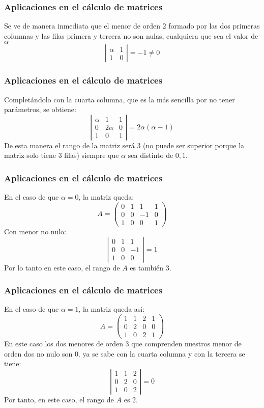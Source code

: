 \documentclass[12pt]{article}
\begin{document}
     \begin{frame}
  \frametitle{Aplicaciones en el c\'alculo de matrices}
Se ve de manera inmediata que el menor de orden 2 formado por las dos primeras columnas y las filas primera y tercera no son nulas, cualquiera que sea el valor de $\alpha$
\[\left|\begin{array}{cc} \alpha & 1 \\ 1&0 \end{array}\right| = -1 \neq 0\]
\end{frame} 


     \begin{frame}
  \frametitle{Aplicaciones en el c\'alculo de matrices}
Complet\'andolo con la cuarta columna, que es la m\'as sencilla por no tener par\'ametros, se obtiene:
\[\left|\begin{array}{ccc} \alpha & 1 &1\\ 0 & 2\alpha &0 \\ 1&0&1 \end{array}\right| = 2\alpha(\alpha-1)\]
De esta manera el rango de la matriz ser\'a 3 (no puede ser superior porque la matriz solo tiene 3 filas) siempre que $\alpha$ sea distinto de $0,1$.
\end{frame} 
  
  
     \begin{frame}
  \frametitle{Aplicaciones en el c\'alculo de matrices}
En el caso de que $\alpha = 0$, la matriz queda:
\[A = \left(\begin{array}{cccc} 0 & 1 & 1 & 1 \\ 0& 0 & -1 & 0 \\ 1&0 & 0 & 1 \end{array}\right)\]
Con menor no nulo:
\[ \left|\begin{array}{ccc} 0 & 1 & 1  \\ 0& 0 & -1  \\ 1&0 & 0  \end{array}\right| = 1\]
Por lo tanto en este caso, el rango de $A$ es tambi\'en 3.
\end{frame} 


     \begin{frame}
  \frametitle{Aplicaciones en el c\'alculo de matrices}
En el caso de que $\alpha = 1$, la matriz queda as\'i:
\[A = \left(\begin{array}{cccc} 1 & 1 & 2 & 1 \\ 0& 2 & 0 & 0 \\ 1&0 & 2 & 1 \end{array}\right)\]
En este caso los dos menores de orden 3 que comprenden nuestros menor de orden dos no nulo son 0. ya se sabe con la cuarta columna y con la tercera se tiene:
\[ \left|\begin{array}{ccc} 1 & 1 & 2  \\ 0& 2 & 0  \\ 1&0 & 2  \end{array}\right| = 0\]
Por tanto, en este caso, el rango de $A$  es 2.
\end{frame} 
\end{document}
